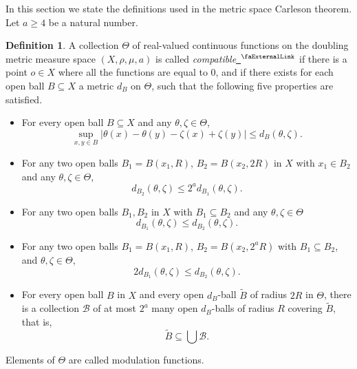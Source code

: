 \documentclass[12pt, reqno]{amsart}
\newcommand{\extlink}{~\ensuremath{{}^\text{\faExternalLink}}}
\theoremstyle{definition}
\newtheorem{definition}{Definition}[section]
\theoremstyle{plain}
\newcommand{\mfa}{{\theta}}
\newcommand{\mfb}{{\zeta}}
\newcommand{\Mf}{{\Theta}}
\begin{document}
In this section we state the definitions used in the metric space Carleson theorem.
Let $a \ge 4$ be a natural number.
\begin{definition}
A collection $\Mf$ of real-valued continuous functions on the doubling metric measure space $(X,\rho,\mu,a)$ is called \emph{compatible}\href{https://github.com/fpvandoorn/carleson/blob/AFM-frozen/Carleson/Defs.lean#L167-L185}{\extlink}
if there is a point $o\in X$ where all the functions are equal to $0$,
and if there exists for each open ball $B \subseteq X$ a metric $d_B$ on $\Mf$,
such that the following five properties are satisfied.
\begin{itemize}\label{def:compatible}
\item For every open ball $B \subseteq X$ and any $\mfa, \mfb \in \Mf$,
\begin{equation}\label{osccontrol}
    \sup_{x,y\in B}|\mfa(x)-{\mfa(y)}- \mfb(x)+{\mfb(y)}| \le d_{B}(\mfa,\mfb).
\end{equation}
\item For any two open balls $B_1=B(x_1,R)$, $B_2= B(x_2,2R)$ in $X$ with $x_1\in B_2$ and any $\mfa,\mfb\in \Mf$,
\begin{equation}\label{firstdb}
    d_{B_2}(\mfa,\mfb) \le 2^a d_{B_1}(\mfa,\mfb).
\end{equation}
\item For any two open balls $B_1, B_2$ in $X$ with $B_1 \subseteq B_2$ and any $\mfa, \mfb \in \Mf$
\begin{equation}\label{monotonedb}
    d_{B_1}(\mfa,\mfb) \le d_{B_2}(\mfa, \mfb).
\end{equation}
\item For any two open balls
$B_1=B(x_1,R)$, $B_2= B(x_2,2^aR)$
with $B_1\subseteq B_2$, and $\mfa,\mfb\in \Mf$,
\begin{equation}\label{seconddb}
    2d_{B_1}(\mfa,\mfb) \le d_{B_2}(\mfa,\mfb).
\end{equation}
\item For every open ball $B$ in $X$ and every open $d_B$-ball $\tilde B$ of radius $2R$ in $\Mf$, there is a collection $\mathcal{B}$ of
at most $2^a$ many open $d_B$-balls of radius $R$ covering $\tilde B$, that is,
\begin{equation}\label{thirddb}
    \tilde B\subseteq \bigcup \mathcal{B}.
\end{equation}
\end{itemize}
Elements of $\Theta$ are called modulation functions.
\end{definition}
\end{document}
